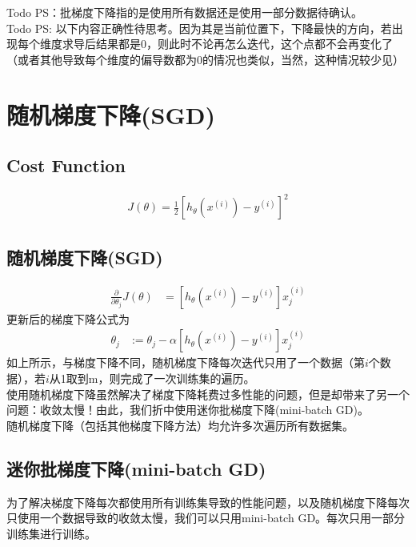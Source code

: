 Todo PS：批梯度下降指的是使用所有数据还是使用一部分数据待确认。 \\
Todo PS: 以下内容正确性待思考。因为其是当前位置下，下降最快的方向，若出现每个维度求导后结果都是0，则此时不论再怎么迭代，这个点都不会再变化了（或者其他导致每个维度的偏导数都为0的情况也类似，当然，这种情况较少见）

\section{随机梯度下降(SGD)}
\subsection{Cost Function}
\begin{equation}\begin{aligned}
	J(\theta) = \frac{1}{2} \left[h_{\theta} {(x^{(i)})} - y^{(i)}\right]^2
\end{aligned}\end{equation}

\subsection{随机梯度下降(SGD)}
\begin{equation}\begin{aligned}
      \frac{\partial} {\partial \theta_j} J(\theta) &= \left[ h_\theta(x^{(i)}) - y^{(i)} \right]x_j^{(i)}
\end{aligned}\end{equation}
更新后的梯度下降公式为
\begin{equation}\begin{aligned}
	\theta_j &:= \theta_j - \alpha\left[ h_\theta(x^{(i)}) - y^{(i)} \right]x_j^{(i)}
\end{aligned}\end{equation}
如上所示，与梯度下降不同，随机梯度下降每次迭代只用了一个数据（第$i$个数据），若$i$从1取到m，则完成了一次训练集的遍历。\\
使用随机梯度下降虽然解决了梯度下降耗费过多性能的问题，但是却带来了另一个问题：收敛太慢！由此，我们折中使用迷你批梯度下降(mini-batch GD)。\\
随机梯度下降（包括其他梯度下降方法）均允许多次遍历所有数据集。

\subsection{迷你批梯度下降(mini-batch GD)}
为了解决梯度下降每次都使用所有训练集导致的性能问题，以及随机梯度下降每次只使用一个数据导致的收敛太慢，我们可以只用mini-batch GD。每次只用一部分训练集进行训练。











